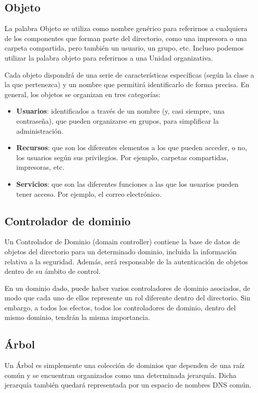 \subsection{Objeto}
La palabra Objeto se utiliza como nombre genérico para referirnos a cualquiera de los componentes que forman parte del directorio, como una impresora o una carpeta compartida, pero también un usuario, un grupo, etc. Incluso podemos utilizar la palabra objeto para referirnos a una Unidad organizativa.

Cada objeto dispondrá de una serie de características específicas (según la clase a la que pertenezca) y un nombre que permitirá identificarlo de forma precisa. En general, los objetos se organizan en tres categorías:
\begin{itemize}
    \item \textbf{Usuarios}: identificados a través de un nombre (y, casi siempre, una contraseña), que pueden organizarse en grupos, para simplificar la administración.
    \item \textbf{Recursos}: que son los diferentes elementos a los que pueden acceder, o no, los usuarios según sus privilegios. Por ejemplo, carpetas compartidas, impresoras, etc.
    \item \textbf{Servicios}: que son las diferentes funciones a las que los usuarios pueden tener acceso. Por ejemplo, el correo electrónico.
\end{itemize}


\subsection{Controlador de dominio}
Un Controlador de Dominio (domain controller) contiene la base de datos de objetos del directorio para un determinado dominio, incluida la información relativa a la seguridad. Además, será responsable de la autenticación de objetos dentro de su ámbito de control.

En un dominio dado, puede haber varios controladores de dominio asociados, de modo que cada uno de ellos represente un rol diferente dentro del directorio. Sin embargo, a todos los efectos, todos los controladores de dominio, dentro del mismo dominio, tendrán la misma importancia.


\subsection{Árbol}
Un Árbol es simplemente una colección de dominios que dependen de una raíz común y se encuentran organizados como una determinada jerarquía. Dicha jerarquía también quedará representada por un espacio de nombres DNS común.

